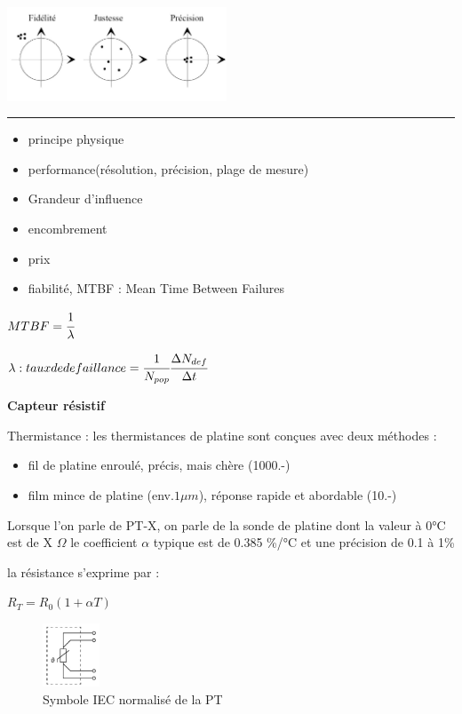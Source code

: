 \documentclass[	DIV=calc,%
							paper=a4,%
							fontsize=11pt,%
							twocolumn]{scrartcl} %
\newcommand{\hformbar}[1]{\bigskip\hrule\vspace{5pt}} %
\newcounter{mycounter}
\newcommand{\formdesc}[1]{\noindent\textbf{#1} \addtocounter{mycounter}{1} \hfill \themycounter}
\begin{document}
\includegraphics[width=0.49\textwidth,center]{img/justesse.JPG}

\hformbar


\formdesc{Choix du capteur}
\begin{itemize}
    \item principe physique 
    \item performance(résolution, précision, plage de mesure)
    \item Grandeur d'influence 
    \item encombrement
    \item prix
    \item fiabilité, MTBF : Mean Time Between Failures
\end{itemize}

$MTBF = \cfrac{1}{\lambda}$

$\lambda : taux de defaillance = \cfrac{1}{N_{pop}}\cfrac{\Delta N_{def}}{\Delta t} $
\newpage

\formdesc{Capteur résistif}

Thermistance :
les thermistances de platine sont conçues avec deux méthodes : 
\begin{itemize}
    \item fil de platine enroulé, précis, mais chère (1000.-)
    \item film mince de platine (env.$1\mu m$), réponse rapide et abordable (10.-)
\end{itemize}
Lorsque l'on parle de PT-X,  on parle de la sonde de platine dont la valeur à 0°C est de X $\Omega$
le coefficient $\alpha$ typique est de 0.385 \%/°C et une précision de 0.1 à 1\%

la résistance s'exprime par :

{\hfill $R_{T} = R_0 (1+\alpha T)$ \hfill}

\begin{figure}[H]
    \begin{center}
        \includegraphics[width=0.15\textwidth]{img/PT.JPG}
        \caption{Symbole IEC normalisé de la PT}
        \label{fig:symbole_PT}
    \end{center}
\end{figure}
\end{document}
